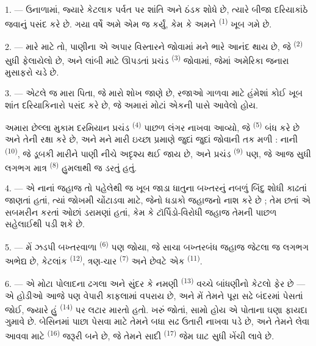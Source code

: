 \VUsaut{4.0mm}
\VUsaut{3.0mm}
\VUsaut{3.0mm}

1. --- ઉનાળામાં, જ્યારે કેટલાક પર્વત પર શાંતિ અને ઠંડક શોધે છે, ત્યારે
બીજા દરિયાકાંઠે જવાનું પસંદ કરે છે. ગયા વર્ષે અમે એમ જ કર્યું, કેમ કે
અમને  \textsuperscript{(1)} ખૂબ ગમે છે.

2. --- મારે માટે તો, પાણીના એ અપાર વિસ્તારને જોવામાં મને ભારે આનંદ થાય
છે, જે  \textsuperscript{(2)} સુધી ફેલાયેલો છે, અને
લાંબી  માટે ઊપડતાં પ્રચંડ 
\textsuperscript{(3)} જોવામાં, જેમાં અમેરિકા જનારા મુસાફરો ચડે છે.

3. --- એટલે જ મારા પિતા, જે મારો શોખ જાણે છે, રજાઓ ગાળવા માટે હંમેશાં
કોઈ ખૂબ શાંત દરિયાકિનારો પસંદ કરે છે, જે અમારાં મોટાં  એકની પાસે આવેલો હોય.

અમારા છેલ્લા મુકામ દરમિયાન  પ્રચંડ 
\textsuperscript{(4)} પાછળ લંગર નાખવા આવ્યો, જે 
\textsuperscript{(5)} બંધ કરે છે અને તેની રક્ષા કરે છે, અને મને મારી
ઇચ્છા પ્રમાણે જુદાં જુદાં  જોવાની તક મળી : નાની
 \textsuperscript{(10)}, જે ડૂબકી મારીને પાણી નીચે અદૃશ્ય
થઈ જાય છે, અને પ્રચંડ  \textsuperscript{(9)} પણ,
જે આજ સુધી લગભગ માત્ર  \textsuperscript{(8)}
હુમલાથી જ ડરતું હતું.

\VUsaut{3.0mm}
\VUsaut{3.0mm}

4. --- એ નાનાં જહાજ તો પહેલેથી જ ખૂબ  જાડા ધાતુના
બખ્તરનું નબળું બિંદુ શોધી કાઢતાં જાણતાં હતાં, ત્યાં જોખમી
 ચોંટાડવા માટે, જેનો ધડાકો જહાજનો નાશ કરે છે ; તેમ
છતાં એ સબમરીન કરતાં ઓછાં ડરામણાં હતાં, કેમ કે ટૉર્પિડો-વિરોધી જહાજ
તેમની પાછળ સહેલાઈથી પડી શકે છે.

5. --- મેં ઝડપી બખ્તરવાળા  \textsuperscript{(6)} પણ જોયા,
જે સાચા બખ્તરબંધ જહાજ જેટલા જ લગભગ અભેદ્ય છે, કેટલાંક  \textsuperscript{(12)}, ત્રણ-ચાર 
\textsuperscript{(7)} અને છેવટે એક 
\textsuperscript{(11)}. 

6. --- એ મોટા પોલાદના ઢગલા અને સુંદર  કે
નમણી  \textsuperscript{(13)} વચ્ચે બાંધણીનો કેટલો
ફેર છે — એ હોડીઓ આજે પણ વેપારી કાફલામાં વપરાય છે, અને મેં તેમને પૂરા
સઢે બંદરમાં પેસતાં જોઈ, જ્યારે હું  \textsuperscript{(14)}
પર લટાર મારતો હતો. ખરું જોતાં,  સામો હોય  એ
પોતાના ઘણા ફાયદા ગુમાવે છે. બેસિનમાં પાછા પેસવા માટે તેમને બધા સઢ ઉતારી
નાખવા પડે છે, અને તેમને લેવા આવવા માટે 
\textsuperscript{(16)} જરૂરી બને છે, જે તેમને સાદી  \textsuperscript{(17)} જેમ ઘાટ સુધી ખેંચી લાવે છે.

